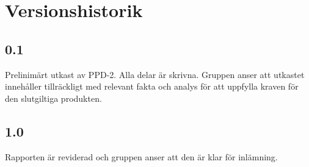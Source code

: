 \section*{Versionshistorik}

\subsection*{0.1}
Prelinimärt utkast av PPD-2. Alla delar är skrivna. Gruppen anser att utkastet innehåller tillräckligt med relevant fakta och analys för att uppfylla kraven för den slutgiltiga produkten.

\subsection*{1.0}
Rapporten är reviderad och gruppen anser att den är klar för inlämning.